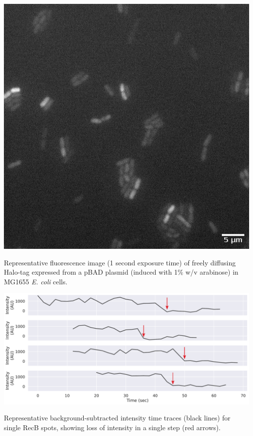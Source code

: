 \begin{suppfigure*}[htbp]
    \begin{center}
        \includegraphics[width=.5\linewidth]{SI_Figures/Free_Halo_image.png}
    \end{center}
    \caption{Representative fluorescence image (1 second exposure time) of freely diffusing Halo-tag expressed from a pBAD plasmid (induced with 1\% w/v arabinose) in MG1655 \textit{E. coli} cells.}\label{SIFig:freehalo_image}
\end{suppfigure*}

\begin{suppfigure*}[htbp]
    \begin{center}
    \includegraphics[width=.8\linewidth]{SI_Figures/SM_traces.pdf}
    \end{center}
    \caption{Representative background-subtracted intensity time traces (black lines) for single RecB spots, showing loss of intensity in a single step (red arrows).}\label{SIFig:SM_traces}
    \end{suppfigure*}

